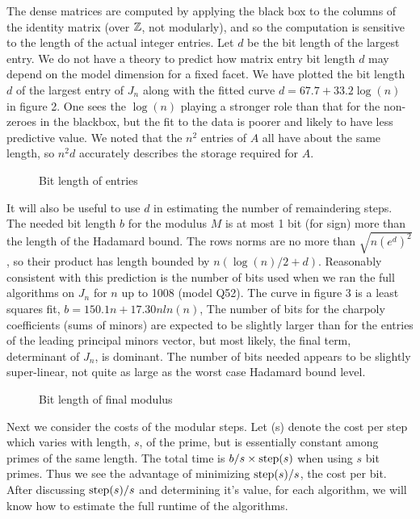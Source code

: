 \documentclass{sig-alternate}
\begin{document}
The dense matrices are computed by applying the black box to the columns of the 
identity matrix (over $\mathbb Z$, not modularly), and so the computation is 
sensitive to the length of the 
actual integer entries.
Let $d$ be the bit length of the 
largest entry.  
We do not have a theory to predict how matrix entry bit length $d$ may depend on the 
model dimension for a fixed facet. 
We have plotted the bit length $d$ of the largest entry of $J_n$ along with
the fitted curve $d = 67.7 + 33.2\log(n)$ in figure 2.  
One sees the $\log(n)$ playing a stronger role than that for the non-zeroes in the blackbox,
but the fit to the data is poorer and likely to have less predictive value.
We noted that the $n^2$ entries of $A$ all have about the same length, so $n^2 d$ accurately
describes the storage required for $A$.
\begin{figure}[h] %
\caption{Bit length of entries}
\end{figure}

It will also be useful to use $d$ in estimating the number of remaindering steps.
The needed bit length $b$ for the modulus $M$ is at most 1 bit (for sign) more 
than the length of the Hadamard bound.  The rows norms are no more than \(\sqrt{n(e^d)^2}\),
so their product has length bounded by $n(\log(n)/2 + d)$.
Reasonably consistent with this prediction is the number of bits used when we ran
the full algorithms on $J_n$ for $n$ up to 1008 (model Q52).  
The curve in figure 3 is a least squares fit,
$b = 150.1 n + 17.30n ln(n)$,
The number of bits for the charpoly coefficients (sums of minors) are expected 
to be slightly larger than for the entries of the  leading principal minors vector,
but most likely, the final term, determinant of $J_n$, is dominant.  
The number of bits needed appears to be slightly super-linear, not quite as large as
the worst case Hadamard bound level.  
\begin{figure}[h] %
\caption{Bit length of final modulus}
\end{figure}

Next we consider the costs of the modular steps.
Let \step(s) denote the cost per step which varies with length, $s$, of the prime, 
but is essentially constant among primes of the same length.
The total time  is $b/s \times \mbox{step}(s)$ when using $s$ bit primes. 
Thus we see the advantage of minimizing $\mbox{step}(s)/s$, the cost per bit.
After discussing $\mbox{step}(s)/s$ and determining it's value, for each algorithm,  
we will know how to estimate the full runtime of the algorithms.
\end{document}
